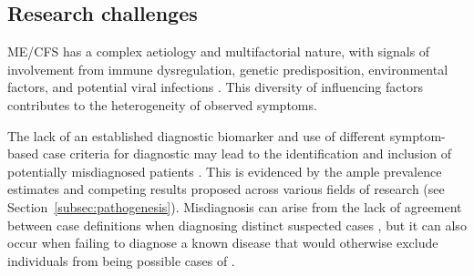 

\subsection{Research challenges}
\label{subsec:research-challenges}


ME/CFS has a complex aetiology and multifactorial nature, with signals of involvement from immune dysregulation, genetic predisposition, environmental factors, and potential viral infections \citep{rivera2019MyalgicEncephalomyelitis}.
This diversity of influencing factors contributes to the heterogeneity of observed symptoms.

The lack of an established diagnostic biomarker and use of different symptom-based case criteria for \cfs diagnostic may lead to the identification and inclusion of potentially misdiagnosed patients \citep{nacul2017DifferingCase}.
This is evidenced by the ample prevalence estimates and competing results proposed across various fields of research (see Section~\ref{subsec:pathogenesis}).
Misdiagnosis can arise from the lack of agreement between case definitions when diagnosing distinct suspected cases \citep{nacul2017DifferingCase, malato2021Statisticalchallenges}, but it can also occur when failing to diagnose a known disease that would otherwise exclude individuals from being possible cases of \cfs \citep{nacul2019HowHave, malato2023ImpactMisdiagnosis}.

